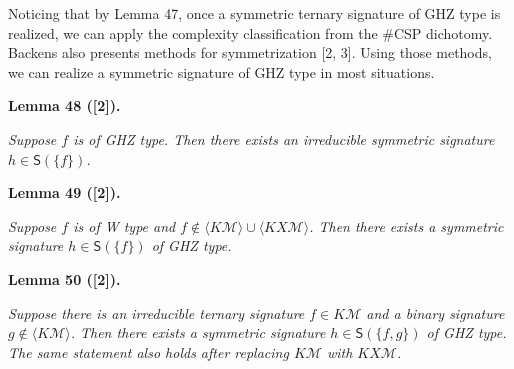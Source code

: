 \documentclass[10pt,a4paper]{article}
\begin{document}



Noticing that by Lemma 47, once a symmetric ternary signature of GHZ type is realized, we can apply the complexity classification from the \#CSP dichotomy. Backens also presents methods for symmetrization [2, 3]. Using those methods, we can realize a symmetric signature of GHZ type in most situations.\par





\par\medskip\noindent\textbf{
\textbf{Lemma 48}\textbf{ }([2])\textbf{.}
}\par



\emph{Suppose $f$ is of GHZ type. Then there exists an irreducible symmetric signature $h\in\textsf{S}(\{f\})$.}\par







\par\medskip\noindent\textbf{
\textbf{Lemma 49}\textbf{ }([2])\textbf{.}
}\par



\emph{Suppose $f$ is of W type and $f\notin\langle K\mathcal{M}\rangle\cup\langle KX\mathcal{M}\rangle$. Then there exists a symmetric signature $h\in\textsf{S}(\{f\})$ of GHZ type.}\par







\par\medskip\noindent\textbf{
\textbf{Lemma 50}\textbf{ }([2])\textbf{.}
}\par



\emph{Suppose there is an irreducible ternary signature $f\in K\mathcal{M}$ and a binary signature $g\notin\langle K\mathcal{M}\rangle$. Then there exists a symmetric signature $h\in\textsf{S}(\{f,g\})$ of GHZ type. The same statement also holds after replacing $K\mathcal{M}$ with $KX\mathcal{M}$.}\par



\end{document}
